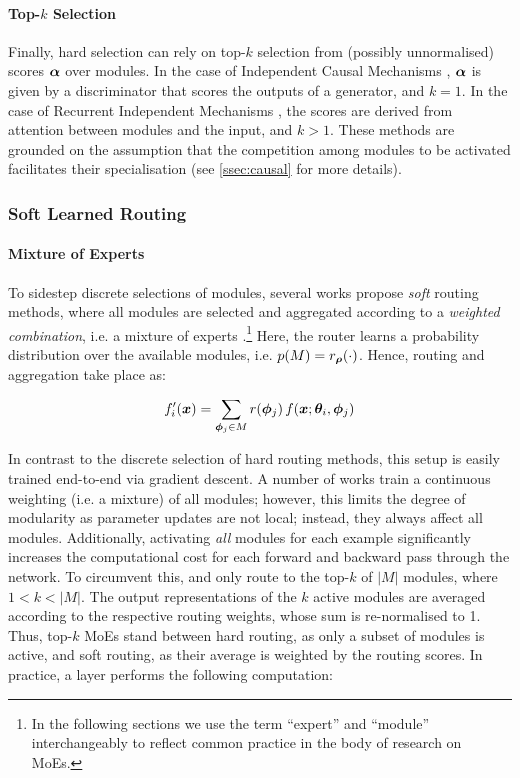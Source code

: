 \documentclass[10pt]{article} %
\begin{document}
\paragraph*{Top-$k$ Selection}
Finally, hard selection can rely on top-$k$ selection from (possibly unnormalised) scores ${\bm{\alpha}}$ over modules. In the case of Independent Causal Mechanisms \citep{parascandolo2018learning}, ${\bm{\alpha}}$ is given by a discriminator that scores the outputs of a generator, and $k=1$. In the case of Recurrent Independent Mechanisms \citep{goyal2019recurrent}, the scores are derived from attention between modules and the input, and $k>1$. These methods are grounded on the assumption that the competition among modules to be activated facilitates their specialisation (see \cref{ssec:causal} for more details).

\subsubsection{Soft Learned Routing} 
\label{sec:routing:softlearnedrouting}

\paragraph*{Mixture of Experts} To sidestep {discrete} selections of modules, several works propose \textit{soft} routing methods, where {all} modules are selected and aggregated according to a \textit{weighted combination}, i.e. a mixture of experts \citep[MoE;][]{jacobs1991adaptive,Jordan1994Hierarchical}.\footnote{In the following sections we use the term ``expert'' and ``module'' interchangeably to reflect common practice in the body of research on MoEs.} Here, the router learns a probability distribution over the available modules, i.e. $p(M) = r_{\bm{\rho}}(\cdot)$. Hence, routing and aggregation take place as:

\begin{equation}
\label{eq:MoE}
    f_i^\prime({\bm{x}}) = \sum_{{\bm{\phi}}_j \in M} r({\bm{\phi}}_j) \, f({\bm{x}}; {\bm{\theta}}_i, {\bm{\phi}}_j)
\end{equation}

In contrast to the discrete selection of {hard routing} methods, this setup is easily trained end-to-end via gradient descent. A number of works \citep[][\textit{inter alia}]{Eigen2013LearningFactored,Meyerson2018,wortsman2020supermasks} train a continuous weighting (i.e. a mixture) of all modules; however, this limits the degree of modularity as parameter updates are not local; instead, they always affect all modules. Additionally, activating \textit{all} modules for each example significantly increases the computational cost for each forward and backward pass through the network. To circumvent  this,  \citet{shazeer2017outrageously} and \citet{Lepikhin2021GShard} only route to the top-$k$  
of $|M|$ modules, where $1 < k < |M|$. The output representations of the $k$ {active} modules are averaged according to the respective routing weights, whose sum is re-normalised to 1. Thus, top-$k$ MoEs stand between hard routing, as only a subset of modules is active, and soft routing, as their average is weighted by the routing scores. In practice, a layer performs the following computation: 
\end{document}
